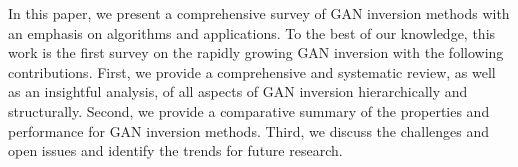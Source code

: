 In this paper, we present a comprehensive survey of GAN inversion methods with an emphasis on algorithms and applications. 
To the best of our knowledge, this work is the first survey on the rapidly growing GAN inversion with the following contributions. 
First, we provide a comprehensive and systematic review, as well as an insightful analysis, of all aspects of GAN inversion hierarchically and structurally.
Second, we provide a comparative summary of the properties and performance for GAN inversion methods. 
Third, we discuss the challenges and open issues and identify the trends for future research.